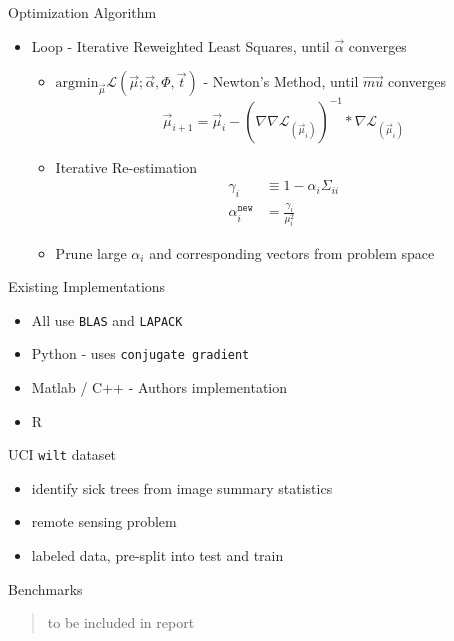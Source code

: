 \documentclass[10pt]{beamer}
\begin{document}
\begin{frame}{Optimization Algorithm}

  \begin{itemize}
  \item Loop - Iterative Reweighted Least Squares, until $\vec{\alpha}$ converges
    \begin{itemize}
    \item \(\mbox{argmin}_{\vec{\mu}} \mathcal{L}(\vec{\mu}; \vec{\alpha}, \Phi, \vec{t})\)
      - Newton's Method, until $\vec{mu}$ converges
      \[\vec{\mu}_{i+1} = \vec{\mu}_i - (\nabla\nabla\mathcal{L}_{(\vec{\mu}_i)})^{-1} * \nabla\mathcal{L}_{(\vec{\mu}_i)}\]
    \item Iterative Re-estimation
      \begin{align*}
        \gamma_i &\equiv 1 - \alpha_i \Sigma_{ii}\\
        \alpha_i^{\texttt{new}} &= \frac{\gamma_i}{\mu_i^2}
      \end{align*}
    \item Prune large $\alpha_i$ and corresponding vectors from problem space
\end{itemize}
  \end{itemize}
\end{frame}

\begin{frame}{Existing Implementations}
  \begin{itemize}
  \item All use \texttt{BLAS} and \texttt{LAPACK}
  \item Python - uses \texttt{conjugate gradient}
  \item Matlab / C++ - Authors implementation
  \item R
  \end{itemize}
\end{frame}

\begin{frame}{UCI \texttt{wilt} dataset}
  \begin{itemize}
  \item identify sick trees from image summary statistics
  \item remote sensing problem
  \item labeled data, pre-split into test and train
  \end{itemize}
\end{frame}

\begin{frame}{Benchmarks}
  \begin{quote}
    to be included in report
  \end{quote}
\end{frame}
\end{document}

